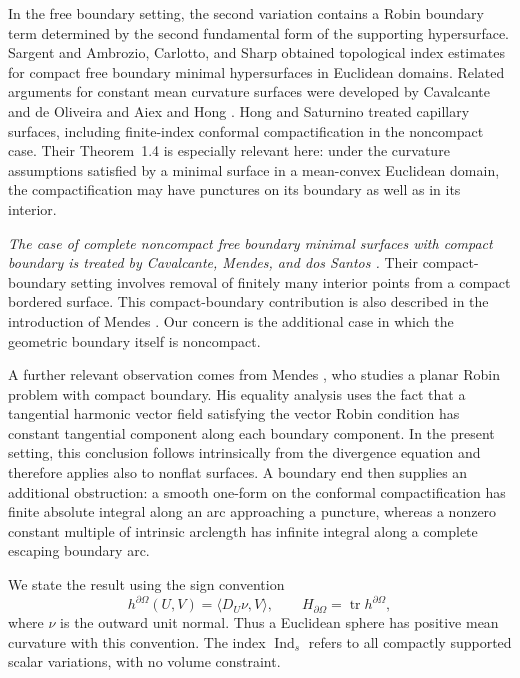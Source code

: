 \documentclass[11pt]{amsart}
\numberwithin{equation}{section}
\theoremstyle{definition}
\theoremstyle{remark}
\DeclareMathOperator{\Ind}{Ind}
\DeclareMathOperator{\tr}{tr}
\begin{document}
In the free boundary setting, the second variation contains a Robin boundary term determined by the second fundamental form of the supporting hypersurface. Sargent \cite{Sargent17} and Ambrozio, Carlotto, and Sharp \cite{ACS18} obtained topological index estimates for compact free boundary minimal hypersurfaces in Euclidean domains. Related arguments for constant mean curvature surfaces were developed by Cavalcante and de Oliveira \cite{CO20} and Aiex and Hong \cite{AH21}. Hong and Saturnino \cite{HS23} treated capillary surfaces, including finite-index conformal compactification in the noncompact case. Their Theorem~1.4 is especially relevant here: under the curvature assumptions satisfied by a minimal surface in a mean-convex Euclidean domain, the compactification may have punctures on its boundary as well as in its interior.

\emph{The case of complete noncompact free boundary minimal surfaces with compact boundary is treated by Cavalcante, Mendes, and dos Santos \cite{CMS26}.} Their compact-boundary setting involves removal of finitely many interior points from a compact bordered surface. This compact-boundary contribution is also described in the introduction of Mendes \cite{Mendes26}. Our concern is the additional case in which the geometric boundary itself is noncompact.

A further relevant observation comes from Mendes \cite{Mendes26}, who studies a planar Robin problem with compact boundary. His equality analysis uses the fact that a tangential harmonic vector field satisfying the vector Robin condition has constant tangential component along each boundary component. In the present setting, this conclusion follows intrinsically from the divergence equation and therefore applies also to nonflat surfaces. A boundary end then supplies an additional obstruction: a smooth one-form on the conformal compactification has finite absolute integral along an arc approaching a puncture, whereas a nonzero constant multiple of intrinsic arclength has infinite integral along a complete escaping boundary arc.

We state the result using the sign convention
\[
h^{\partial\Omega}(U,V)=\langle D_U\nu,V\rangle,
\qquad H_{\partial\Omega}=\tr h^{\partial\Omega},
\]
where $\nu$ is the outward unit normal. Thus a Euclidean sphere has positive mean curvature with this convention. The index $\Ind_s$ refers to all compactly supported scalar variations, with no volume constraint.
\end{document}
